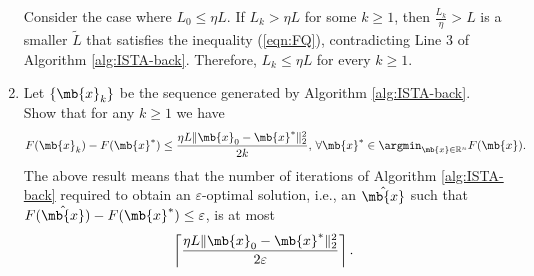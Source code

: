 \begin{exercise}
\begin{enumerate}
\begin{solution}
                Consider the case where $L_0 \le \eta L$. If $L_k > \eta L$ for some $k\ge 1$, then $\frac{L_k}{\eta} > L$ is a smaller $\tilde{L}$ that satisfies the inequality (\ref{eqn:FQ}), contradicting Line 3 of Algorithm \ref{alg:ISTA-back}. Therefore, $L_k\le \eta L$ for every $k\ge 1$.
            \end{solution}
        \item Let $\{\mb{x}_k\}$ be the sequence generated by Algorithm \ref{alg:ISTA-back}. Show that for any $k\ge 1$ we have
            \begin{align*}
                F(\mb{x}_k)-F(\mb{x}^*)\le \frac{\eta L \|\mb{x}_0-\mb{x}^*\|_2^2}{2k},\,\forall \mb{x}^*\in \argmin_{\mb{x}\in\mathbb{R}^n} F(\mb{x}).
            \end{align*}
            The above result means that the number of iterations of Algorithm \ref{alg:ISTA-back} required to obtain an $\varepsilon$-optimal solution, i.e., an $\hat{\mb{x}}$ such that $F(\hat{\mb{x}})-F(\mb{x}^*)\le \varepsilon$, is at most
            \begin{align*}
                \left\lceil \frac{\eta L \|\mb{x}_0-\mb{x}^*\|_2^2}{2\varepsilon} \right\rceil.
            \end{align*}


\end{enumerate}
\end{exercise}
